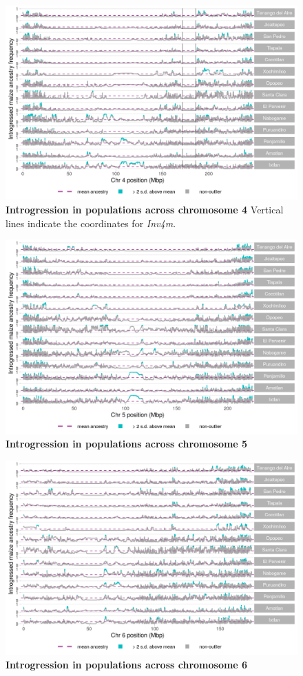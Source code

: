 \begin{figure}[ht]
\includegraphics[width=.85\textwidth]{chapter2/figures/mexicana_shared_outliers_chr_4.png}
\caption{\color{Gray} \textbf{Introgression in \mexicana populations across chromosome 4} Vertical lines indicate the coordinates for \textit{Inv4m}.}
\label{mexicana_chr4}
\end{figure}

\begin{figure}[ht]
\includegraphics[width=.85\textwidth]{chapter2/figures/mexicana_shared_outliers_chr_5.png}
\caption{\color{Gray} \textbf{Introgression in \mexicana populations across chromosome 5}}
\label{mexicana_chr5}
\end{figure}

\begin{figure}[ht]
\includegraphics[width=.85\textwidth]{chapter2/figures/mexicana_shared_outliers_chr_6.png}
\caption{\color{Gray} \textbf{Introgression in \mexicana populations across chromosome 6}}
\label{mexicana_chr6}
\end{figure}


